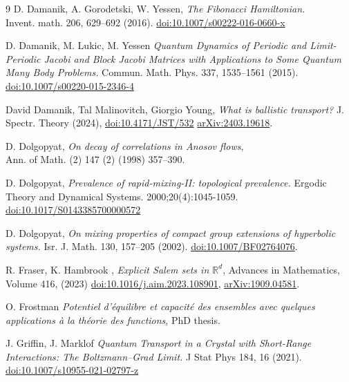 \documentclass[a4paper]{article}
\theoremstyle{definition}
\begin{document}
\begin{thebibliography}{9}
    {D. Damanik, A. Gorodetski, W. Yessen},
    \emph{The Fibonacci Hamiltonian.} \\
    Invent. math. 206, 629–692 (2016). \href{https://doi.org/10.1007/s00222-016-0660-x}{doi:10.1007/s00222-016-0660-x}

    {D. Damanik, M. Lukic, M. Yessen} \emph{Quantum Dynamics of Periodic and Limit-Periodic Jacobi and Block Jacobi Matrices with Applications to Some Quantum Many Body Problems.} Commun. Math. Phys. 337, 1535–1561 (2015). \href{https://doi.org/10.1007/s00220-015-2346-4}{doi:10.1007/s00220-015-2346-4}

    {David Damanik, Tal Malinovitch, Giorgio Young},
    \emph{What is ballistic transport?}
    J. Spectr. Theory (2024), \href{https://ems.press/journals/jst/articles/14298255}{doi:10.4171/JST/532} \href{https://arxiv.org/abs/2403.19618}{arXiv:2403.19618}.
 
    {D. Dolgopyat},
    \emph{On decay of correlations in Anosov flows}, \\
    Ann. of Math. (2) 147 (2) (1998) 357–390.


    {D. Dolgopyat},
    \emph{Prevalence of rapid-mixing-II: topological prevalence.}
    Ergodic Theory and Dynamical Systems. 2000;20(4):1045-1059. \href{https://doi.org/10.1017/S0143385700000572}{doi:10.1017/S0143385700000572}


    {D. Dolgopyat},
    \emph{On mixing properties of compact group extensions of hyperbolic systems.}
    Isr. J. Math. 130, 157–205 (2002). \href{https://doi.org/10.1007/BF02764076}{doi:10.1007/BF02764076}.






    {R. Fraser, K. Hambrook },
    \emph{Explicit Salem sets in $\mathbb{R}^d$},
    Advances in Mathematics, Volume 416, (2023)
    \href{https://doi.org/10.1016/j.aim.2023.108901}{doi:10.1016/j.aim.2023.108901}, \href{https://arxiv.org/abs/1909.04581}{arXiv:1909.04581}.


    {O. Frostman}
    \emph{Potentiel d'équilibre et capacité des ensembles avec quelques applications à la théorie des functions},
    PhD thesis.

    {J. Griffin, J. Marklof}
    \emph{ Quantum Transport in a Crystal with Short-Range Interactions: The Boltzmann–Grad Limit.} J Stat Phys 184, 16 (2021). \href{https://doi.org/10.1007/s10955-021-02797-z}{doi:10.1007/s10955-021-02797-z}



\end{thebibliography}
\end{document}
